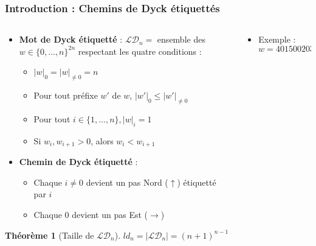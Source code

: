 \documentclass{beamer}
\newtheorem*{thm}{Théorème}
\begin{document}
\begin{frame} %
    \fontsize{9}{11}
    \frametitle{Introduction : Chemins de Dyck étiquettés}
    \begin{columns}
        \begin{column}{0.65\textwidth}
            \begin{itemize}
                \item \textbf{Mot de Dyck étiquetté} : $\mathcal{LD}_n =$
                    ensemble des $w \in \{0,\ldots, n\}^{2n}$ respectant les 
                    quatre conditions :
                \begin{itemize}
                    \item $|w|_0 = |w|_{\neq 0} = n$
                    \item Pour tout préfixe $w'$ de $w$, $|w'|_0 \leqslant
                        |w'|_{\neq 0}$
                    \item Pour tout $i \in \{1, \ldots, n\}, |w|_i = 1$
                    \item Si $w_i, w_{i+1} > 0$, alors $w_i < w_{i+1}$
                \end{itemize}
                \item \textbf{Chemin de Dyck étiquetté} :
                \begin{itemize}
                    \item Chaque $i \neq 0$ devient un pas Nord ($\uparrow$)
                        étiquetté par $i$
                    \item Chaque 0 devient un pas Est ($\rightarrow$)
                \end{itemize}
            \end{itemize}

            \begin{thm}[Taille de $\mathcal{LD}_n$]
                $\displaystyle ld_n = |\mathcal{LD}_n| =
                (n+1)^{n-1}$
            \end{thm}

        \end{column}
        \begin{column}{0.35\textwidth} 
                \begin{itemize}
                    \item Exemple : $w = 4015002030$
                \end{itemize}
                
        \end{column}
    \end{columns}
\end{frame}
\end{document}
